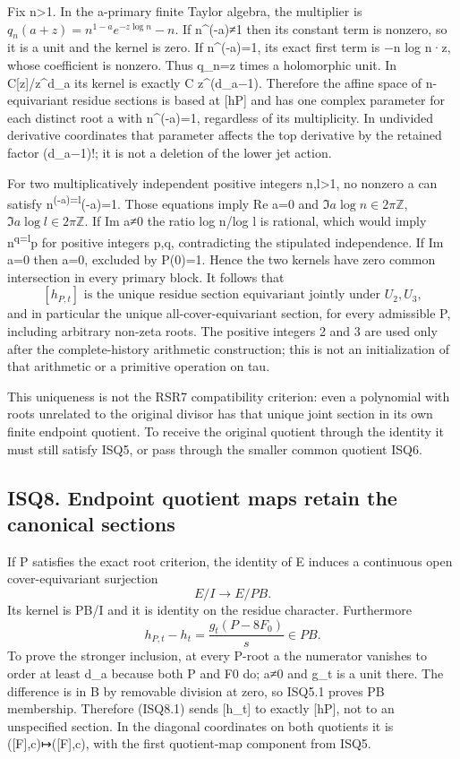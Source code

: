 \documentclass[
]{article}
\begin{document}
Fix n\textgreater1. In the a-primary finite Taylor algebra, the multiplier is \(q_n(a+z)=n^{1-a}e^{-z\log n}-n\). If n\^{}(-a)≠1 then its constant term is nonzero, so it is a unit and the kernel is zero. If n\^{}(-a)=1, its exact first term is −n log n·z, whose coefficient is nonzero. Thus q\_n=z times a holomorphic unit. In C{[}z{]}/z\^{}d\_a its kernel is exactly C z\^{}(d\_a−1). Therefore the affine space of n-equivariant residue sections is based at {[}hP{]} and has one complex parameter for each distinct root a with n\^{}(-a)=1, regardless of its multiplicity. In undivided derivative coordinates that parameter affects the top derivative by the retained factor (d\_a−1)!; it is not a deletion of the lower jet action.

For two multiplicatively independent positive integers n,l\textgreater1, no nonzero a can satisfy n\textsuperscript{(-a)=l}(-a)=1. Those equations imply Re a=0 and \(\Im a\log n\in2\pi\mathbb Z\), \(\Im a\log l\in2\pi\mathbb Z\). If Im a≠0 the ratio log n/log l is rational, which would imply n\textsuperscript{q=l}p for positive integers p,q, contradicting the stipulated independence. If Im a=0 then a=0, excluded by P(0)=1. Hence the two kernels have zero common intersection in every primary block. It follows that \[
\boxed{[h_{P,t}]\text{ is the unique residue section equivariant jointly under }U_2,U_3,}
\tag{ISQ7.2}
\] and in particular the unique all-cover-equivariant section, for every admissible P, including arbitrary non-zeta roots. The positive integers 2 and 3 are used only after the complete-history arithmetic construction; this is not an initialization of that arithmetic or a primitive operation on tau.

This uniqueness is not the RSR7 compatibility criterion: even a polynomial with roots unrelated to the original divisor has that unique joint section in its own finite endpoint quotient. To receive the original quotient through the identity it must still satisfy ISQ5, or pass through the smaller common quotient ISQ6.

\subsection{ISQ8. Endpoint quotient maps retain the canonical sections}\label{isq8.-endpoint-quotient-maps-retain-the-canonical-sections}

If P satisfies the exact root criterion, the identity of E induces a continuous open cover-equivariant surjection \[
E/I\longrightarrow E/PB.
\tag{ISQ8.1}
\] Its kernel is PB/I and it is identity on the residue character. Furthermore \[
h_{P,t}-h_t=\frac{g_t(P-8F_0)}s\in PB.
\tag{ISQ8.2}
\] To prove the stronger inclusion, at every P-root a the numerator vanishes to order at least d\_a because both P and F0 do; a≠0 and g\_t is a unit there. The difference is in B by removable division at zero, so ISQ5.1 proves PB membership. Therefore (ISQ8.1) sends {[}h\_t{]} to exactly {[}hP{]}, not to an unspecified section. In the diagonal coordinates on both quotients it is ({[}F{]},c)↦({[}F{]},c), with the first quotient-map component from ISQ5.
\end{document}
